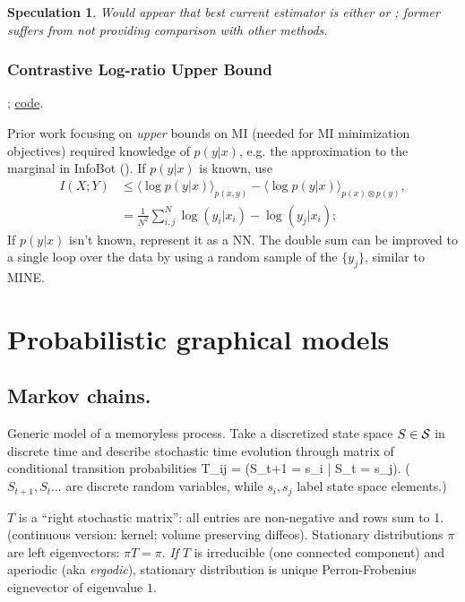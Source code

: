 \documentclass[notitlepage,openany,11pt]{report}
\theoremstyle{plain}%
\newtheorem{notethm}{Speculation}
\newenvironment{notebox}
    {\noindent\colorlet{shadecolor}{cyan!15}\begin{shaded}\begin{notethm}}
    {\end{notethm}\end{shaded}}
\numberwithin{equation}{section}
\begin{document}
\begin{notebox}
Would appear that best current estimator is either \cite{ChanEtAl:19} or \cite{ChoiLee:20}; former suffers from not providing comparison with other methods.
\end{notebox}

\subsubsection{Contrastive Log-ratio Upper Bound}
\cite{ChengEtAl:20}; \href{https://github.com/Linear95/CLUB}{code}.

Prior work focusing on \emph{upper} bounds on MI (needed for MI minimization objectives) required knowledge of $p(y|x)$, e.g. the approximation to the marginal in InfoBot (). If $p(y|x)$ is known, use
\begin{align*}
I(X;Y) &\leq \langle \log p(y|x) \rangle_{p(x,y)} - \langle \log p(y|x) \rangle_{p(x) \otimes p(y)}, \\
{} &= \frac{1}{N^2} \sum_{i,j}^{N} \log(y_i|x_i) - \log(y_j|x_i);
\end{align*}
If $p(y|x)$ isn't known, represent it as a NN. The double sum can be improved to a single loop over the data by using a random sample of the $\{ y_{j} \}$, similar to MINE. 





\section{Probabilistic graphical models}

\subsection{Markov chains.} 
Generic model of a memoryless process. Take a discretized state space $S \in \mathcal{S}$ in discrete time and describe stochastic time evolution through matrix of conditional transition probabilities
\be
T_{ij} = (S_{t+1} = s_{i} | S_{t} = s_{j}).
\ee
($S_{t+1}, S_{t}...$ are discrete random variables, while $s_{i}, s_{j}$ label state space elements.)

$T$ is a ``right stochastic matrix'': all entries are non-negative and rows sum to 1. (continuous version: kernel; volume preserving diffeos). Stationary distributions $\pi$ are left eigenvectors: $\pi T = \pi$. \emph{If} $T$ is irreducible (one connected component) and aperiodic (aka \emph{ergodic}), stationary distribution is unique Perron-Frobenius eignevector of eigenvalue $1$.
\end{document}
